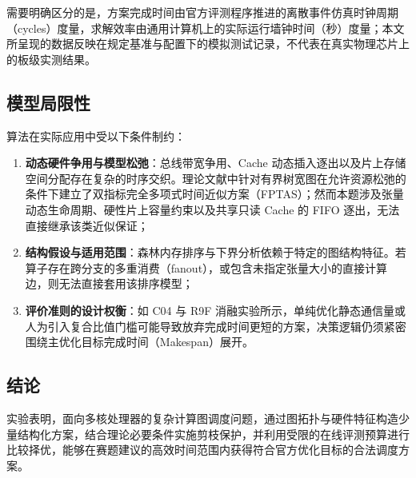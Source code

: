 \documentclass[anonymous,withtoc]{gmcm2026}
\providecommand{\tightlist}{\setlength{\itemsep}{0pt}\setlength{\parskip}{0pt}}
\begin{document}
需要明确区分的是，方案完成时间由官方评测程序推进的离散事件仿真时钟周期（cycles）度量，求解效率由通用计算机上的实际运行墙钟时间（秒）度量；本文所呈现的数据反映在规定基准与配置下的模拟测试记录，不代表在真实物理芯片上的板级实测结果。

\subsection{模型局限性}

算法在实际应用中受以下条件制约：

\begin{enumerate}
\def\labelenumi{\arabic{enumi}.}
\tightlist
\item
  \textbf{动态硬件争用与模型松弛}：总线带宽争用、Cache 动态插入逐出以及片上存储空间分配存在复杂的时序交织。理论文献中针对有界树宽图在允许资源松弛的条件下建立了双指标完全多项式时间近似方案（FPTAS）\cite{ref11}；然而本题涉及张量动态生命周期、硬性片上容量约束以及共享只读 Cache 的 FIFO 逐出，无法直接继承该类近似保证；
\item
  \textbf{结构假设与适用范围}：森林内存排序与下界分析依赖于特定的图结构特征。若算子存在跨分支的多重消费（fanout），或包含未指定张量大小的直接计算边，则无法直接套用该排序模型；
\item
  \textbf{评价准则的设计权衡}：如 C04 与 R9F 消融实验所示，单纯优化静态通信量或人为引入复合比值门槛可能导致放弃完成时间更短的方案，决策逻辑仍须紧密围绕主优化目标完成时间（Makespan）展开。
\end{enumerate}

\subsection{结论}

实验表明，面向多核处理器的复杂计算图调度问题，通过图拓扑与硬件特征构造少量结构化方案，结合理论必要条件实施剪枝保护，并利用受限的在线评测预算进行比较择优，能够在赛题建议的高效时间范围内获得符合官方优化目标的合法调度方案。
\end{document}
